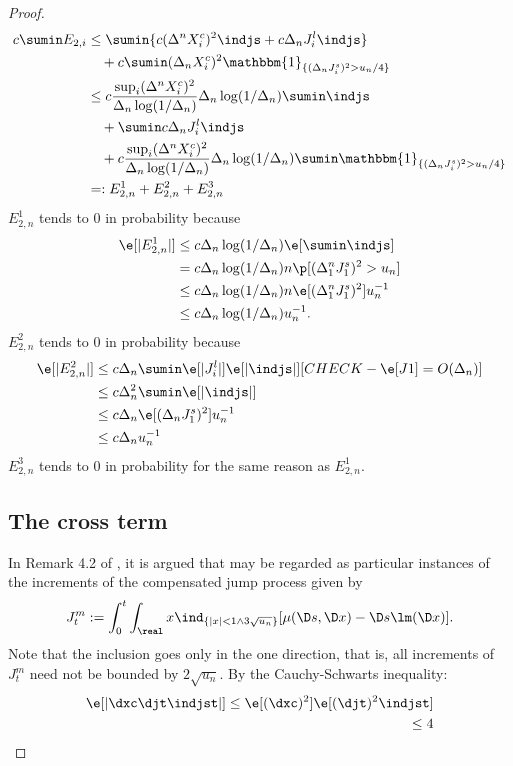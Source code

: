 \begin{proof}
\begin{align}
  c\sumin E_{2,i} &\le\sumin \{  c (\Delta^n X^c_i)^2 \indjs +  c\Delta_n J^l_i \indjs \} \notag\\
  &\quad + c \sumin (\Delta_n X^c_i)^2\mathbbm{1}_{\{(\Delta_n J^s_i)^2 > u_n/4\}}\\ 
  & \le  c \frac{\sup_i (\Delta^nX^c_i)^2}{\Delta_n \log (1/\Delta_n)} \Delta_n \log (1/\Delta_n)\sumin \indjs \notag \\
  &\quad + \sumin c \Delta_n J^l_i \indjs \notag \\
  &\quad + c \frac{\sup_i (\Delta^nX^c_i)^2}{\Delta_n \log (1/\Delta_n)} \Delta_n \log (1/\Delta_n)\sumin \mathbbm{1}_{\{(\Delta_n J^s_i)^2 > u_n/4\}}\notag\\
  &=: E^1_{2,n} + E^2_{2,n} + E^3_{2,n}\notag
  \label{}
\end{align}
$ E^1_{2,n}$ tends to 0 in probability because 
\begin{align}
  \e[\vert E^1_{2,n} \vert] & \le c \Delta_n \log (1/\Delta_n)\e[  \sumin \indjs]  \notag \\
  & =  c \Delta_n \log (1/\Delta_n) n \p [ (\Delta_1^n J^s_1)^2 > u_n] \notag \\
  &\le c \Delta_n \log (1/\Delta_n) n  \e[(\Delta_1^n J^s_1)^2] u_n^{-1}\\
  & \le c \Delta_n \log (1/\Delta_n)  u_n^{-1}.
  \label{}
\end{align}
$ E^2_{2,n}$ tends to 0 in probability because 
\begin{align}
  \e[\vert E^2_{2,n}\vert] &\le c  \Delta_n\sumin \e[\vert J^l_i \vert] \e[\vert\indjs\vert] [CHECK -  \e[J1] = O(\Delta_n)] \notag\\ 
&\le c  \Delta_n^2\sumin  \e[\vert\indjs\vert]\notag \\
&\le c  \Delta_n  \e[ (\Delta_n J^s_1)^2]u_n^{-1}\notag \\
&\le c  \Delta_n  u_n^{-1}\notag 
  \label{}
\end{align}
$E^3_{2,n}$ tends to 0  in  probability for the same reason as $E^1_{2,n}$.
\subsection{The cross term}
In Remark 4.2 of \cite{Mancini2009}, it is argued that  \djt \indjst may be regarded as particular instances of the increments of the compensated jump process given by  
\begin{align}
  J^m_t := \int_0^t \int_\real x\ind_{\{\vert x \vert <  1 \wedge 3 \sqrt{u_n}\}} [\mu(\D s, \D x) - \D s \lm (\D x)].\notag
  \label{}
\end{align}
Note that the inclusion goes only in the one direction, that is, all increments of $J^m_t$ need not be bounded by $2 \sqrt{u_n}$.
By the Cauchy-Schwarts inequality:
\begin{align}
   \e[\vert \dxc \djt \indjst\vert] \le
   \e[(\dxc)^2] \e[ (\djt)^2 \indjst]\\
   \le 4
  \notag
  \label{}
\end{align}
\end{proof}
